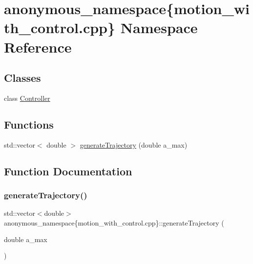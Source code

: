 \hypertarget{namespaceanonymous__namespace_02motion__with__control_8cpp_03}{}\section{anonymous\+\_\+namespace\{motion\+\_\+with\+\_\+control.\+cpp\} Namespace Reference}
\label{namespaceanonymous__namespace_02motion__with__control_8cpp_03}
\subsection*{Classes}
\begin{DoxyCompactItemize}
\item 
class \hyperlink{classanonymous__namespace_02motion__with__control_8cpp_03_1_1Controller}{Controller}
\end{DoxyCompactItemize}
\subsection*{Functions}
\begin{DoxyCompactItemize}
\item 
std\+::vector$<$ double $>$ \hyperlink{namespaceanonymous__namespace_02motion__with__control_8cpp_03_a96cf55e603f54e4305aaff129fc95d0a}{generate\+Trajectory} (double a\+\_\+max)
\end{DoxyCompactItemize}


\subsection{Function Documentation}
\mbox{\label{namespaceanonymous__namespace_02motion__with__control_8cpp_03_a96cf55e603f54e4305aaff129fc95d0a}} 
\subsubsection{\texorpdfstring{generate\+Trajectory()}{generateTrajectory()}}
{\footnotesize\ttfamily std\+::vector$<$double$>$ anonymous\+\_\+namespace\{motion\+\_\+with\+\_\+control.\+cpp\}\+::generate\+Trajectory (\begin{DoxyParamCaption}\item[{double}]{a\+\_\+max }\end{DoxyParamCaption})}



